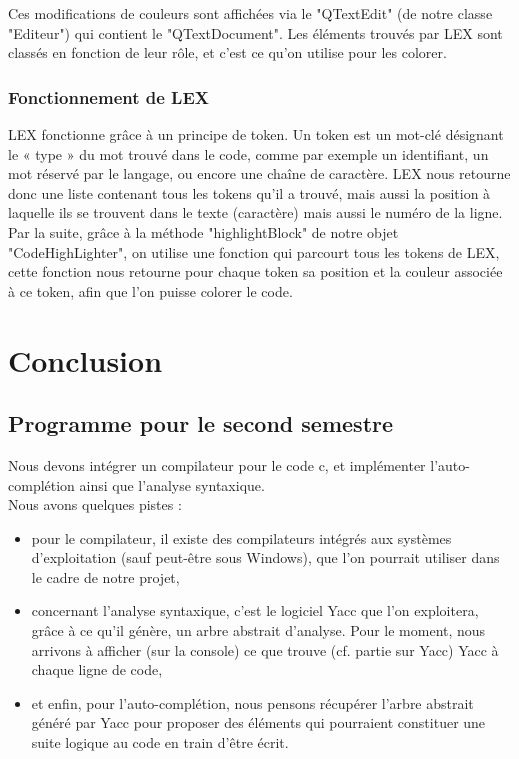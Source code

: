 \documentclass[a4paper,12pt]{article}
\begin{document}
		Ces modifications de couleurs sont affichées via le "QTextEdit" (de notre classe "Editeur") qui contient le "QTextDocument". Les éléments trouvés par LEX sont classés en fonction de leur rôle, et c'est ce qu'on utilise pour les colorer.

		\subsubsection*{Fonctionnement de LEX}
		
	LEX fonctionne grâce à un principe de token. Un token est un mot-clé désignant le « type » du mot trouvé dans le code, comme par exemple un identifiant, un mot réservé par le langage, ou encore une chaîne de caractère. LEX nous retourne donc une liste contenant tous les tokens qu’il a trouvé, mais aussi la position à laquelle ils se trouvent dans le texte (caractère) mais aussi le numéro de la ligne.\\
	 Par la suite, grâce à la méthode "highlightBlock" de notre objet "CodeHighLighter", on utilise une fonction qui parcourt tous les tokens de LEX, cette fonction nous retourne pour chaque token sa position et la couleur associée à ce token, afin que l’on puisse colorer le code.
	
\section{Conclusion}

	\subsection{Programme pour le second semestre}
	Nous devons intégrer un compilateur pour le code c, et implémenter l'auto-complétion ainsi que l'analyse syntaxique. \\
	Nous avons quelques pistes : 
	\begin{itemize}
		\item pour le compilateur, il existe des compilateurs intégrés aux systèmes d'exploitation (sauf peut-être sous Windows), que l'on pourrait utiliser dans le cadre de notre projet,
		\item concernant l'analyse syntaxique, c'est le logiciel Yacc que l'on exploitera, grâce à ce qu'il génère, un arbre abstrait d'analyse. Pour le moment, nous arrivons à afficher (sur la console) ce que trouve (cf. partie sur Yacc) Yacc à chaque ligne de code,
		\item et enfin, pour l'auto-complétion, nous pensons récupérer l'arbre abstrait généré par Yacc pour proposer des éléments qui pourraient constituer une suite logique au code en train d'être écrit.
	\end{itemize}
	
\end{document}
